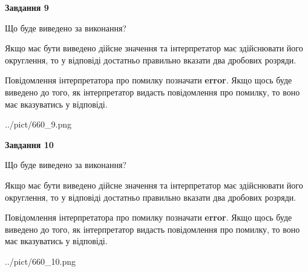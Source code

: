 \documentclass[12pt, ukrainian]{article}
\begin{document}
{\begin {Large}
{\begin {center}\textbf{Завдання 9}\end {center}}\par
Що буде виведено за виконання? \par

Якщо має бути виведено дійсне значення та інтерпретатор має здійснювати його округлення, 
то у відповіді достатньо правильно вказати два дробових розряди.

Повідомлення інтерпретатора про помилку позначати \textbf{error}.
Якщо щось буде виведено до того, як інтерпретатор видасть повідомлення про помилку, 
то воно має вказуватись у відповіді. \par

\begin{center}
	{../pict/660_9.png}
\end{center}
\newpage

{\begin {center}\textbf{Завдання 10}\end {center}}\par
Що буде виведено за виконання? \par

Якщо має бути виведено дійсне значення та інтерпретатор має здійснювати його округлення, 
то у відповіді достатньо правильно вказати два дробових розряди.

Повідомлення інтерпретатора про помилку позначати \textbf{error}.
Якщо щось буде виведено до того, як інтерпретатор видасть повідомлення про помилку, 
то воно має вказуватись у відповіді. \par

\begin{center}
	{../pict/660_10.png}
\end{center}
\newpage

\end {Large}}
\end{document}
